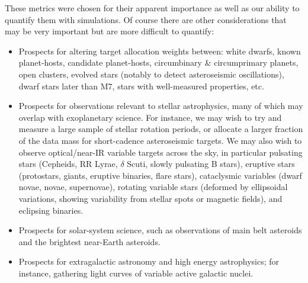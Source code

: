 These metrics were chosen for their apparent importance as well as our
ability to quantify them with simulations. Of course there are other considerations
that may be very important but are more difficult to quantify:
\begin{itemize}
\item Prospects for altering target allocation weights between: white
  dwarfs, known planet-hosts, candidate planet-hosts, circumbinary \&
  circumprimary planets, open clusters, evolved stars (notably to
  detect asteroseismic oscillations), dwarf stars later than M7, stars
  with well-measured properties, etc.
\item Prospects for observations relevant to stellar astrophysics, many of which may overlap with exoplanetary science.
    For instance, we may wish to try and measure a large sample of stellar rotation periods, or allocate a larger fraction of the data mass for short-cadence asteroseismic targets.
    We may also wish to observe optical/near-IR variable targets across the sky, in particular 
	pulsating stars (Cepheids, RR Lyrae, $\delta$ Scuti, slowly pulsating B 
	stars),
	eruptive stars (protostars, giants, eruptive binaries, flare stars), 
	cataclysmic variables (dwarf novae, novae, supernovae), 
	rotating variable stars (deformed by ellipsoidal variations, showing variability from stellar spots or magnetic fields),
	and eclipsing binaries.
\item Prospects for solar-system science, such as observations of main belt asteroids and the brightest near-Earth asteroids.
\item Prospects for extragalactic astronomy and high energy astrophysics; for instance, gathering light curves of variable active galactic nuclei.
\end{itemize}

